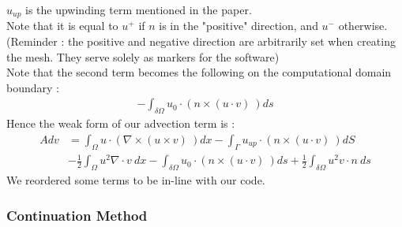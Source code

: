 \documentclass[11pt,twoside,a4paper]{article}
\begin{document}
$u_{up}$ is the upwinding term mentioned in the paper.\\
Note that it is equal to $u^+$ if $n$ is in the "positive" direction, and $u^-$ otherwise. (Reminder : the positive and negative direction are arbitrarily set when creating the mesh. They serve solely as markers for the software)\\
Note that the second term becomes the following on the computational domain boundary :
\begin{align*}
- \int_{\delta \Omega} u_0 \cdot (n \times (u \cdot v) \ ) ds
\end{align*}
Hence the weak form of our advection term is :
\begin{align}
 Adv &= \int_\Omega u \cdot (\nabla \times (u \times v) \ ) dx - \int_{\Gamma} u_{up} \cdot (n \times (u \cdot v) \ ) dS \\
&- \frac{1}{2} \int_\Omega u^2 \nabla \cdot v \ dx - \int_{\delta \Omega} u_0 \cdot (n \times (u \cdot v) \ ) ds
+ \frac{1}{2} \int_{\delta \Omega } u^2 v \cdot n \ ds
\end{align}
We reordered some terms to be in-line with our code.

\subsubsection{Continuation Method}
\end{document}
